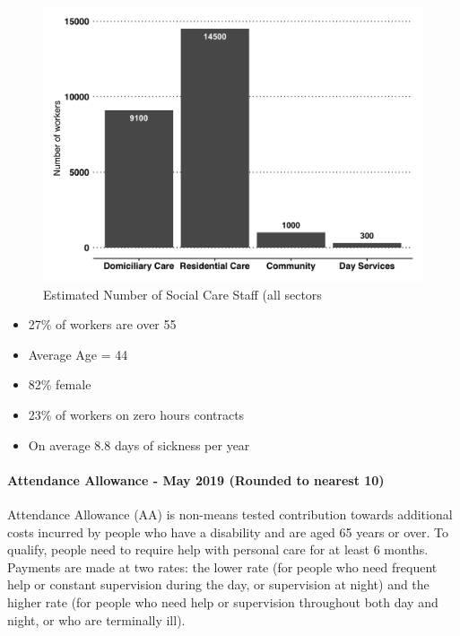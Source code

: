 \begin{figure}[h]
    \caption{Estimated Number of Social Care Staff (all sectors}\label{fig:sc-workforce}
    \centering
    \includegraphics[width = \linewidth]{images/03-sc-workforce.png}
\end{figure}

\begin{itemize}[noitemsep]
    \item 27\% of workers are over 55
    \item Average Age = 44
    \item 82\% female
    \item 23\% of workers on zero hours contracts
    \item On average 8.8 days of sickness per year
\end{itemize}
   
\paragraph{Attendance Allowance - May 2019 (Rounded to nearest 10)} Attendance Allowance (AA) is non-means tested contribution towards additional costs incurred by people who have a disability and are aged 65 years or over. To qualify, people need to require help with personal care for at least 6 months. Payments are made at two rates: the lower rate (for people who need frequent help or constant supervision during the day, or supervision at night) and the higher rate (for people who need help or supervision throughout both day and night, or who are terminally ill).

